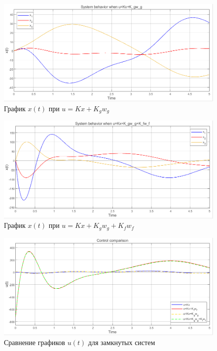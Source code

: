 \documentclass[a4paper, 12pt]{article}
\begin{document}
    \begin{figure}[H]
        \centering
        \includegraphics[scale=0.6]{1task_x_kxkg.png}
        \captionsetup{skip=0pt}
        \caption{График $x(t)$ при $u=Kx+K_gw_g$}
        \label{fig:1task_x_kxkg}
    \end{figure}
    \begin{figure}[H]
        \centering
        \includegraphics[scale=0.6]{1task_x_kxkgkf.png}
        \captionsetup{skip=0pt}
        \caption{График $x(t)$ при $u=Kx+K_gw_g+K_fw_f$}
        \label{fig:1task_x_kxkgkf}
    \end{figure}
    \begin{figure}[H]
        \centering
        \includegraphics[scale=0.6]{1task_u.png}
        \captionsetup{skip=0pt}
        \caption{Сравнение графиков $u(t)$ для замкнутых систем}
        \label{fig:1task_u}
    \end{figure}
\end{document}
